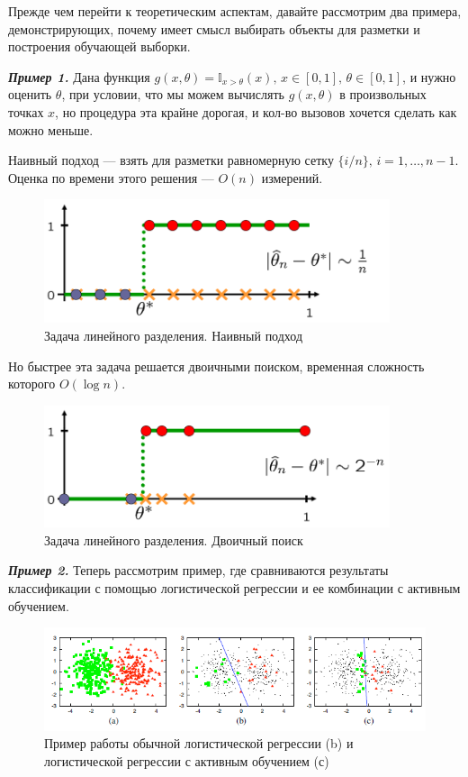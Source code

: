 \documentclass[specialist, 12pt, href]{article}
\begin{document}
Прежде чем перейти к теоретическим аспектам, давайте рассмотрим два
примера, демонстрирующих, почему имеет смысл выбирать объекты для
разметки и построения обучающей выборки.

\emph{\textbf{Пример 1.}} Дана функция
\(g(x, \theta) = \mathbb{I}_{x > \theta}(x),\, x \in [0, 1],\, \theta \in [0, 1]\),
и нужно оценить \(\theta\), при условии, что мы можем вычислять
\(g(x, \theta)\) в произвольных точках \(x\), но процедура эта крайне
дорогая, и кол-во вызовов хочется сделать как можно меньше.

Наивный подход --- взять для разметки равномерную сетку
\(\{i/n\},\, i = 1,\ldots, n - 1\). Оценка по времени этого решения ---
\(O(n)\) измерений.

\begin{figure}[htbp]
\centering
\includegraphics[width=4in]{img/naive.png}
\caption{Задача линейного разделения. Наивный подход}
\end{figure}

Но быстрее эта задача решается двоичными поиском, временная сложность
которого \(O(\log n)\).

\begin{figure}[htbp]
\centering
\includegraphics[width=4in]{img/bs.png}
\caption{Задача линейного разделения. Двоичный поиск}
\end{figure}

\emph{\textbf{Пример 2.}} Теперь рассмотрим пример, где сравниваются
результаты классификации с помощью логистической регрессии и ее
комбинации с активным обучением.

\begin{figure}[htbp]
\centering
\includegraphics[width=6in]{img/example.png}
\caption{Пример работы обычной логистической регрессии (b) и
логистической регрессии с активным обучением (с)}
\end{figure}
\end{document}
